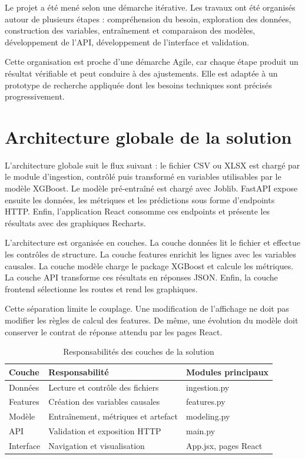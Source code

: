 \documentclass[12pt,a4paper]{report}
\begin{document}
Le projet a été mené selon une démarche itérative. Les travaux ont été
organisés autour de plusieurs étapes : compréhension du besoin, exploration
des données, construction des variables, entraînement et comparaison des
modèles, développement de l'API, développement de l'interface et validation.

Cette organisation est proche d'une démarche Agile, car chaque étape produit
un résultat vérifiable et peut conduire à des ajustements. Elle est adaptée à
un prototype de recherche appliquée dont les besoins techniques sont précisés
progressivement.

\section{Architecture globale de la solution}

L'architecture globale suit le flux suivant : le fichier CSV ou XLSX est chargé
par le module d'ingestion, contrôlé puis transformé en variables utilisables
par le modèle XGBoost. Le modèle pré-entraîné est chargé avec Joblib. FastAPI
expose ensuite les données, les métriques et les prédictions sous forme
d'endpoints HTTP. Enfin, l'application React consomme ces endpoints et
présente les résultats avec des graphiques Recharts.

L'architecture est organisée en couches. La couche données lit le fichier et
effectue les contrôles de structure. La couche features enrichit les lignes
avec les variables causales. La couche modèle charge le package XGBoost et
calcule les métriques. La couche API transforme ces résultats en réponses
JSON. Enfin, la couche frontend sélectionne les routes et rend les graphiques.

Cette séparation limite le couplage. Une modification de l'affichage ne doit
pas modifier les règles de calcul des features. De même, une évolution du
modèle doit conserver le contrat de réponse attendu par les pages React.

\begin{table}[htbp]
\centering
\caption{Responsabilités des couches de la solution}
\label{tab:couches-architecture}
\begin{tabular}{p{} p{} p{}}
\toprule
Couche & Responsabilité & Modules principaux \\
\midrule
Données & Lecture et contrôle des fichiers & ingestion.py \\
Features & Création des variables causales & features.py \\
Modèle & Entraînement, métriques et artefact & modeling.py \\
API & Validation et exposition HTTP & main.py \\
Interface & Navigation et visualisation & App.jsx, pages React \\
\bottomrule
\end{tabular}
\end{table}
\end{document}
